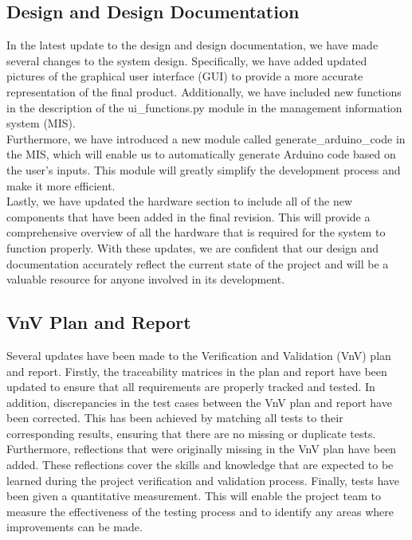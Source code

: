 \documentclass[12pt,titlepage]{article}
\begin{document}
\subsection{Design and Design Documentation}
In the latest update to the design and design documentation, we have made several changes to the system design. Specifically, we have added updated pictures of the graphical user interface (GUI) to provide a more accurate representation of the final product. Additionally, we have included new functions in the description of the ui\_functions.py module in the management information system (MIS).\\

Furthermore, we have introduced a new module called generate\_arduino\_code in the MIS, which will enable us to automatically generate Arduino code based on the user's inputs. This module will greatly simplify the development process and make it more efficient.\\

Lastly, we have updated the hardware section to include all of the new components that have been added in the final revision. This will provide a comprehensive overview of all the hardware that is required for the system to function properly. With these updates, we are confident that our design and documentation accurately reflect the current state of the project and will be a valuable resource for anyone involved in its development.

\subsection{VnV Plan and Report}

Several updates have been made to the Verification and Validation (VnV) plan and report. Firstly, the traceability matrices in the plan and report have been updated to ensure that all requirements are properly tracked and tested. In addition, discrepancies in the test cases between the VnV plan and report have been corrected. This has been achieved by matching all tests to their corresponding results, ensuring that there are no missing or duplicate tests. Furthermore, reflections that were originally missing in the VnV plan have been added. These reflections cover the skills and knowledge that are expected to be learned during the project verification and validation process. Finally, tests have been given a quantitative measurement. This will enable the project team to measure the effectiveness of the testing process and to identify any areas where improvements can be made.
\end{document}
